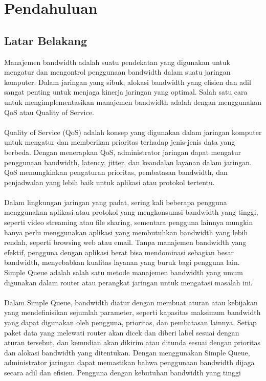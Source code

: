 \section{Pendahuluan}
\subsection{Latar Belakang}
Manajemen bandwidth adalah suatu pendekatan yang digunakan untuk mengatur dan
mengontrol penggunaan bandwidth dalam suatu jaringan komputer. Dalam jaringan yang
sibuk, alokasi bandwidth yang efisien dan adil sangat penting untuk menjaga kinerja jaringan
yang optimal. Salah satu cara untuk mengimplementasikan manajemen bandwidth adalah
dengan menggunakan QoS atau Quality of Service.\\\\
Quality of Service (QoS) adalah konsep yang digunakan dalam jaringan komputer untuk
mengatur dan memberikan prioritas terhadap jenis-jenis data yang berbeda. Dengan
menerapkan QoS, administrator jaringan dapat mengatur penggunaan bandwidth, latency,
jitter, dan keandalan layanan dalam jaringan. QoS memungkinkan pengaturan prioritas,
pembatasan bandwidth, dan penjadwalan yang lebih baik untuk aplikasi atau protokol
tertentu.\\\\
Dalam lingkungan jaringan yang padat, sering kali beberapa pengguna menggunakan aplikasi
atau protokol yang mengkonsumsi bandwidth yang tinggi, seperti video streaming atau file
sharing, sementara pengguna lainnya mungkin hanya perlu menggunakan aplikasi yang
membutuhkan bandwidth yang lebih rendah, seperti browsing web atau email. Tanpa
manajemen bandwidth yang efektif, pengguna dengan aplikasi berat bisa mendominasi
sebagian besar bandwidth, menyebabkan kualitas layanan yang buruk bagi pengguna lain.
Simple Queue adalah salah satu metode manajemen bandwidth yang umum digunakan dalam
router atau perangkat jaringan untuk mengatasi masalah ini.\\\\
Dalam Simple Queue, bandwidth diatur dengan membuat aturan atau kebijakan yang
mendefinisikan sejumlah parameter, seperti kapasitas maksimum bandwidth yang dapat
digunakan oleh pengguna, prioritas, dan pembatasan lainnya. Setiap paket data yang
melewati router akan dicek dan diberi label sesuai dengan aturan tersebut, dan kemudian akan
dikirim atau ditunda sesuai dengan prioritas dan alokasi bandwidth yang ditentukan. Dengan
menggunakan Simple Queue, administrator jaringan dapat memastikan bahwa penggunaan
bandwidth dijaga secara adil dan efisien. Pengguna dengan kebutuhan bandwidth yang tinggi
